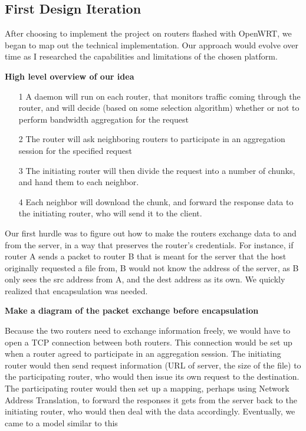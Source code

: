 \documentclass[12pt]{article}
\newcommand{\comment}[1]
{\par {\bfseries \color{blue} #1 \par}}
\begin{document}
	\subsection{First Design Iteration}
		
		After choosing to implement the project on routers flashed with OpenWRT, we began to map out the technical implementation. Our approach would evolve over time as I researched the capabilities and limitations of the chosen platform. 

		{\bf High level overview of our idea}
		\begin{itemize}
			\item[1] A daemon will run on each router, that monitors traffic coming through the router, and will decide (based on some selection algorithm) whether or not to perform bandwidth aggregation for the request
			\item[2] The router will ask neighboring routers to participate in an aggregation session for the specified request
			\item[3] The initiating router will then divide the request into a number of chunks, and hand them to each neighbor.
			\item[4] Each neighbor will download the chunk, and forward the response data to the initiating router, who will send it to the client.
		\end{itemize}

		Our first hurdle was to figure out how to make the routers exchange data to and from the server, in a way that preserves the router's credentials. For instance, if router A sends a packet to router B that is meant for the server that the host originally requested a file from, B would not know the address of the server, as B only sees the src address from A, and the dest address as its own. We quickly realized that encapsulation was needed. 

		\comment{Make a diagram of the packet exchange before encapsulation}

		Because the two routers need to exchange information freely, we would have to open a TCP connection between both routers. This connection would be set up when a router agreed to participate in an aggregation session. The initiating router would then send request information (URL of server, the size of the file) to the participating router, who would then issue its own request to the destination. The participating router would then set up a mapping, perhaps using Network Address Translation, to forward the responses it gets from the server back to the initiating router, who would then deal with the data accordingly. Eventually, we came to a model similar to this
\end{document}
